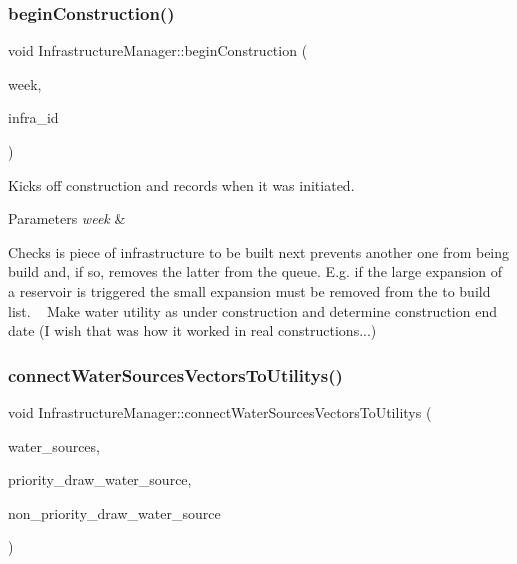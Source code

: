 \subsubsection{\texorpdfstring{begin\+Construction()}{beginConstruction()}}
{\footnotesize\ttfamily void Infrastructure\+Manager\+::begin\+Construction (\begin{DoxyParamCaption}\item[{int}]{week,  }\item[{int}]{infra\+\_\+id }\end{DoxyParamCaption})}

Kicks off construction and records when it was initiated. 
\begin{DoxyParams}{Parameters}
{\em week} & \\
\hline
\end{DoxyParams}
Checks is piece of infrastructure to be built next prevents another one from being build and, if so, removes the latter from the queue. E.\+g. if the large expansion of a reservoir is triggered the small expansion must be removed from the to build list. ~\newline
 Make water utility as under construction and determine construction end date (I wish that was how it worked in real constructions...) \mbox{\label{classInfrastructureManager_a8ff698443fd4f32e28677aa9ef34c2dc}} 
\subsubsection{\texorpdfstring{connect\+Water\+Sources\+Vectors\+To\+Utilitys()}{connectWaterSourcesVectorsToUtilitys()}}
{\footnotesize\ttfamily void Infrastructure\+Manager\+::connect\+Water\+Sources\+Vectors\+To\+Utilitys (\begin{DoxyParamCaption}\item[{vector$<$ \mbox{\hyperlink{classWaterSource}{Water\+Source}} $\ast$$>$ \&}]{water\+\_\+sources,  }\item[{vector$<$ int $>$ \&}]{priority\+\_\+draw\+\_\+water\+\_\+source,  }\item[{vector$<$ int $>$ \&}]{non\+\_\+priority\+\_\+draw\+\_\+water\+\_\+source }\end{DoxyParamCaption})}

